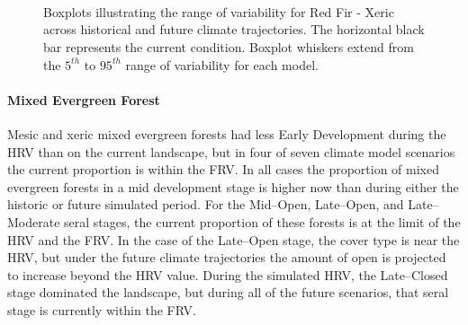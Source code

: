 \begin{figure}[htbp]
  \centering
   \\
   \\
    \\
    \caption{Boxplots illustrating the range of variability for Red Fir - Xeric across historical and future climate trajectories. The horizontal black bar represents the current condition. Boxplot whiskers extend from the $5^{th}$ to $95^{th}$ range of variability for each model. }
  \label{fig:covcond_rfrx_frv}
\end{figure} %

\paragraph*{Mixed Evergreen Forest} Mesic and xeric mixed evergreen forests had less Early Development during the HRV than on the current landscape, but in four of seven climate model scenarios the current proportion is within the FRV. In all cases the proportion of mixed evergreen forests in a mid development stage is higher now than during either the historic or future simulated period. For the Mid--Open, Late--Open, and Late--Moderate seral stages, the current proportion of these forests is at the limit of the HRV and the FRV. In the case of the Late--Open stage, the cover type is near the HRV, but under the future climate trajectories the amount of open is projected to increase beyond the HRV value. During the simulated HRV, the Late--Closed stage dominated the landscape, but during all of the future scenarios, that seral stage is currently within the FRV. 

